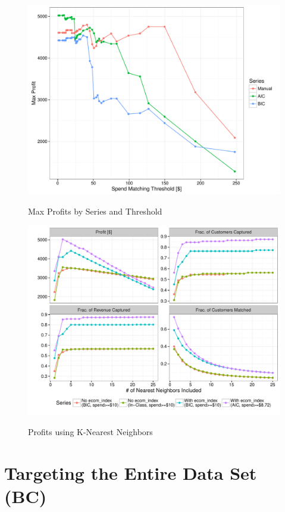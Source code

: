 


\begin{figure}[!htb]
  \centering
  \caption{Max Profits by Series and Threshold}
  \includegraphics[scale=.5]{threshold_max_profit.pdf}
  \label{fig:threshold_max_profit}
\end{figure}


\begin{figure}[!htb]
  \centering
  \caption{Profits using K-Nearest Neighbors}
  \includegraphics[scale=.75]{profits.pdf}
  \label{fig:profits}
\end{figure}

\section{Targeting the Entire Data Set (BC)} %



